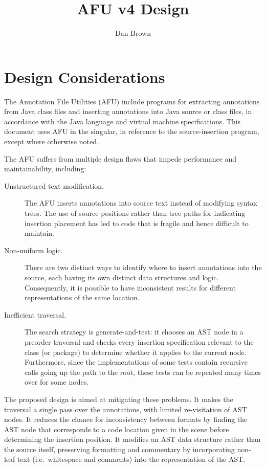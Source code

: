 \documentclass{article}
\title{AFU v4 Design}
\author{Dan Brown}
\begin{document}
\maketitle

\section{Design Considerations}

The Annotation File Utilities (AFU) include programs for extracting
annotations from Java class files and inserting annotations into Java
source or class files, in accordance with the Java language and virtual
machine specifications.  This
document uses AFU in the singular, in reference to the source-insertion
program, except where otherwise noted.

The AFU suffers from multiple design flaws that impede performance and
maintainability, including:

\begin{description}
\item[Unstructured text modification.]  The AFU inserts
annotations into source text instead of modifying syntax trees.
The use of source positions rather than tree paths for indicating
insertion placement has led to code that is fragile and hence difficult
to maintain.
\item[Non-uniform logic.]  There are two distinct ways to
identify where to insert annotations into the source, each having its
own distinct data structures and logic.  Consequently, it is possible to
have inconsistent results for different representations of the same
location.
\item[Inefficient traversal.]  The search strategy is
generate-and-test: it chooses an AST node in a preorder traversal and
checks every insertion specification relevant to the class (or package)
to determine whether it applies to the current node.  Furthermore, since
the implementations of some tests contain recursive calls going up the
path to the root, these tests can be repeated many times over for some
nodes.
\end{description}

The proposed design is aimed at mitigating these problems.  It makes
the traversal a single pass over the annotations, with limited
re-visitation of AST nodes.  It reduces the chance for inconsistency
between formats by finding the AST node that corresponds to a code
location given in the scene before determining the insertion position.
It modifies an AST data structure rather than the source itself,
preserving formatting and commentary by incorporating non-leaf text
(i.e.\ whitespace and comments) into the representation of the AST.
\end{document}
